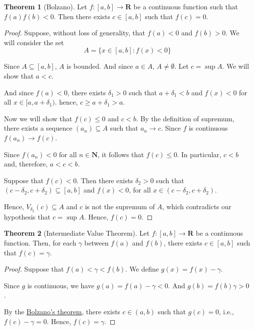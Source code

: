 \documentclass[12pt,a4paper]{article}
\theoremstyle{definition}
\newtheorem{theorem}{Theorem}[section]
\begin{document}
\begin{theorem}[Bolzano]\label{thm:bolzano-cont-fun}
	Let $f : [a,b] \longrightarrow \textbf{R}$ be a continuous function such that $f(a)f(b)<0$. Then there exists $c \in [a,b]$ such that $f(c) = 0$.
\end{theorem}

\begin{proof}
	Suppose, without loss of generality, that $f(a) < 0$ and $f(b) > 0$. We will consider the set \[ A = \{x \in [a,b] : f(x) < 0\} \]
	
	Since $A \subseteq [a,b]$, $A$ is bounded. And since $a \in A$, $A \neq \emptyset$. Let $c = \sup A$. We will show that $a < c$.
	
	And since $f(a) < 0$, there exists $\delta_1 > 0$ such that $a + \delta_1 < b$ and $f(x) < 0$ for all $x \in [a, a+\delta_1)$. hence, $c \geq a+\delta_1 > a$.
	
	Now we will show that $f(c) \leq 0$ and $c < b$. By the definition of supremum, there exists a sequence $(a_n) \subseteq A$ such that $a_n \longrightarrow c$. Since $f$ is continuous $f(a_n) \longrightarrow f(c)$. 
	
	Since $f(a_n) < 0$ for all $n \in \textbf{N}$, it follows that $f(c) \leq 0$. In particular, $c<b$ and, therefore, $a < c < b$.
	
	Suppose that $f(c) < 0$. Then there exists $\delta_2 > 0$ such that $(c - \delta_2, c+\delta_2) \subseteq [a,b]$ and $f(x) < 0$, for all $x \in (c - \delta_2, c+\delta_2)$.
	
	Hence, $V_{\delta_2}(c) \subseteq A$ and $c$ is not the supremum of $A$, which contradicts our hypothesis that $c = \sup A$. Hence, $f(c) = 0$.
\end{proof}

\begin{theorem}[Intermediate Value Theorem]
	Let $f:[a,b] \longrightarrow \textbf{R}$ be a continuous function. Then, for each $\gamma$ between $f(a)$ and $f(b)$, there exists $c \in [a,b]$ such that $f(c) = \gamma$.
\end{theorem}

\begin{proof}
	Suppose that $f(a) < \gamma < f(b)$. We define $g(x) = f(x) - \gamma$.
	
	Since $g$ is continuous, we have $g(a) = f(a) - \gamma < 0$. And $g(b) = f(b) \gamma > 0$.
	
	By the \hyperref[thm:bolzano-cont-fun]{Bolzano's theorem}, there exists $c \in (a,b)$ such that $g(c) = 0$, i.e., $f(c) - \gamma = 0$. Hence, $f(c) = \gamma$.
\end{proof}
\end{document}

